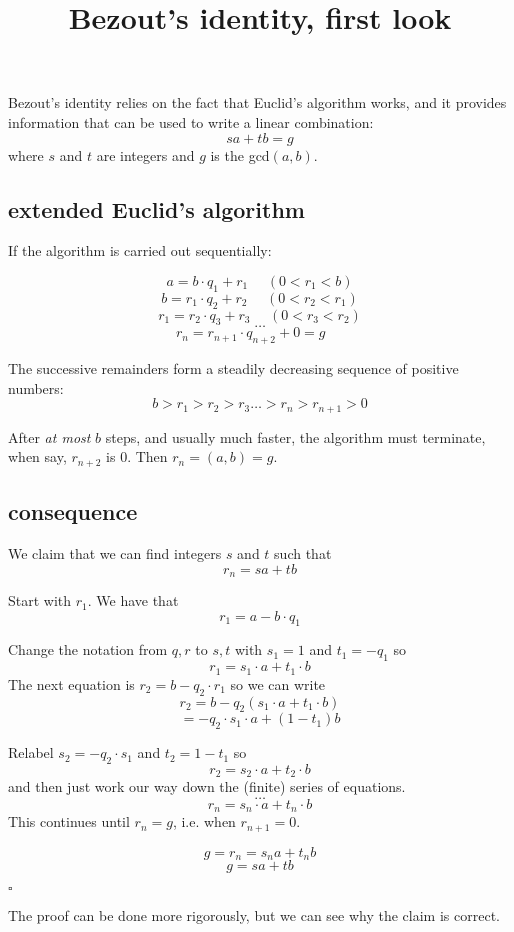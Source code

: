 \documentclass[11pt, oneside]{article}
\title{Bezout's identity, first look}
\date{}
\begin{document}
\maketitle
\Large

Bezout's identity relies on the fact that Euclid's algorithm works, and it provides information that can be used to write a linear combination:
\[ sa + tb = g \]
where $s$ and $t$ are integers and $g$ is the gcd$(a,b)$.

\subsection*{extended Euclid's algorithm}

If the algorithm is carried out sequentially:

\[ a = b \cdot q_1 + r_1 \ \ \ \ \ \ (0 < r_1 < b) \]
\[ b = r_1 \cdot q_2 + r_2 \ \ \ \ \ \ (0 < r_2 < r_1) \]
\[ r_1 = r_2 \cdot q_3 + r_3 \ \ \ \ \ \ (0 < r_3 < r_2) \]
\[ \dots \]
\[ r_{n} = r_{n+1} \cdot q_{n+2} + 0 = g \ \ \ \ \ \ \]

The successive remainders form a steadily decreasing sequence of positive numbers:
\[ b > r_1 > r_2 > r_3 \dots > r_n > r_{n+1} > 0 \]

After \emph{at most} $b$ steps, and usually much faster, the algorithm must terminate, when say, $r_{n+2}$ is 0.  Then $r_n = (a,b) = g$.

\subsection*{consequence}

We claim that we can find integers $s$ and $t$ such that
\[ r_n = sa + tb \]

Start with $r_1$.  We have that 
\[ r_1 = a - b \cdot q_1 \]  

Change the notation from $q,r$ to $s,t$ with $s_1 = 1$ and $t_1 = -q_1$ so
\[ r_1 = s_1 \cdot a + t_1 \cdot b \]
The next equation is $r_2 = b - q_2 \cdot r_1 $ so we can write
\[ r_2 = b - q_2(s_1 \cdot a + t_1 \cdot b) \]
\[ = -q_2 \cdot s_1 \cdot a + (1 - t_1)b \]

Relabel $s_2 = -q_2 \cdot s_1$ and $t_2 = 1 - t_1$ so
\[ r_2 = s_2 \cdot a + t_2 \cdot b \]
and then just work our way down the (finite) series of equations.
\[ \dots \]
\[ r_{n} = s_{n} \cdot a + t_{n} \cdot b \]
This continues until $r_{n} =  g$, i.e. when $r_{n+1} = 0$.

\[ g = r_n = s_{n} a + t_{n} b \]
\[ g = sa + tb \]

$\square$

The proof can be done more rigorously, but we can see why the claim is correct.
\end{document}
